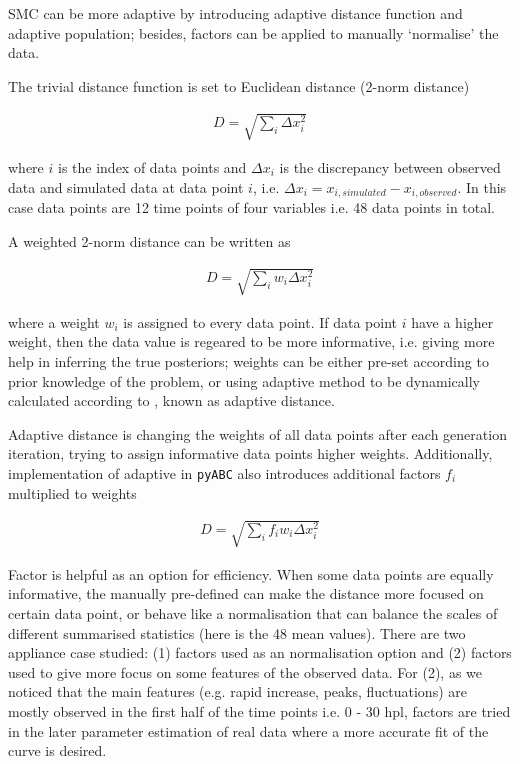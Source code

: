 
SMC can be more adaptive by introducing adaptive distance function and adaptive population; besides, factors can be applied to manually `normalise' the data.

The trivial distance function is set to Euclidean distance (2-norm distance)

\begin{align}
    \label{eq:dis}
    D=\sqrt{\sum_i \Delta x_i^2}
\end{align}

where $i$ is the index of data points and $\Delta x_i$ is the discrepancy between  observed data and simulated data at data point $i$, i.e. $\Delta x_i = x_{i, simulated}-x_{i, observed}$. In this case data points are 12 time points of four variables i.e. 48 data points in total.

A weighted 2-norm distance can be written as

\begin{align}
    \label{dis_w}
    D=\sqrt{\sum_i w_i \Delta x_i^2}
\end{align}

where a weight $w_i$ is assigned to every data point. If data point $i$ have a higher weight, then the data value is regeared to be more informative, i.e. giving more help in inferring the true posteriors; weights can be either pre-set according to prior knowledge of the problem, or using adaptive method to be dynamically calculated according to , known as adaptive distance.

Adaptive distance is changing the weights of all data points after each generation iteration, trying to assign informative data points higher weights. Additionally, implementation of adaptive in \verb|pyABC| also introduces additional factors $f_i$ multiplied to weights \cite{ref:adpt_dis}

\begin{align}
    \label{dis_f}
    D=\sqrt{\sum_i f_iw_i \Delta x_i^2}
\end{align}

Factor is helpful as an option for efficiency. When some data points are equally informative, the manually pre-defined can make the distance more focused on certain data point, or behave like a normalisation that can balance the scales of different summarised statistics (here is the 48 mean values). There are two appliance case studied: (1) factors used as an normalisation option and (2) factors used to give more focus on some features of the observed data. For (2), as we noticed that the main features (e.g. rapid increase, peaks, fluctuations) are mostly observed in the first half of the time points i.e. 0 - 30 hpl, factors are tried in the later parameter estimation of real data where a more accurate fit of the curve is desired.

